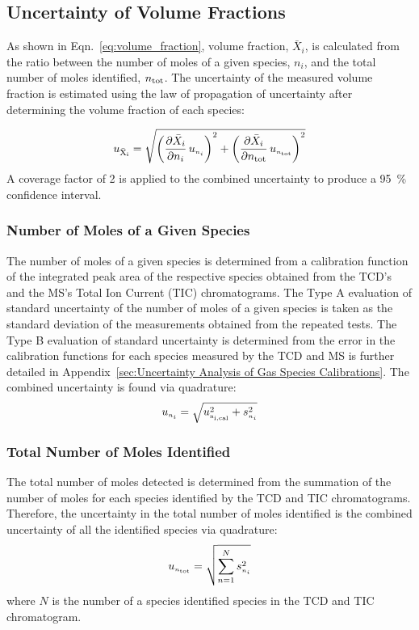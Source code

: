 \documentclass[12pt]{article}
\begin{document}
\subsection{Uncertainty of Volume Fractions} \label{sec:UncertaintyMoleFrac}
As shown in Eqn.~\ref{eq:volume_fraction}, volume fraction, $\bar{X}_{i}$, is calculated from the ratio between the number of moles of a given species, $n_{i}$, and the total number of moles identified, $n_{\rm tot}$. The uncertainty of the measured volume fraction is estimated using the law of propagation of uncertainty after determining the volume fraction of each species:

\begin{equation}
\label{eq:Volume_Frac_Uncertainty}
u_\mathrm{\bar{X}_{i}} = \sqrt{{\left( \frac{\partial \bar{X}_{i}}{\partial n_{i}}\,u_{\scriptscriptstyle n_{i}} \right)}^2+{\left(\frac{\partial \bar{X}_{i}}{\partial n_{\rm tot}}\,u_{\scriptscriptstyle n_{\rm tot}}\right)}^2}
\end{equation}
A coverage factor of 2 is applied to the combined uncertainty to produce a 95~\% confidence interval.

\subsubsection{Number of Moles of a Given Species}
\label{ssec:Number_of_Moles_of_a_Given_Species}

The number of moles of a given species is determined from a calibration function of the integrated peak area of the respective species obtained from the TCD's and the MS's Total Ion Current (TIC) chromatograms. The Type A evaluation of standard uncertainty of the number of moles of a given species is taken as the standard deviation of the measurements obtained from the repeated tests. The Type B evaluation of standard uncertainty is determined from the error in the calibration functions for each species measured by the TCD and MS is further detailed in Appendix~\ref{sec:Uncertainty Analysis of Gas Species Calibrations}. The combined uncertainty is found via quadrature:
\begin{equation}
\label{eq:gasspeciesuncertaintycertainty}
u_{\scriptscriptstyle n_{i}} = \sqrt{ u_{\rm \scriptscriptstyle n_{i,\rm cal}}^2 + s_{\scriptscriptstyle n_{i}}^2}
\end{equation}

\subsubsection{Total Number of Moles Identified}
\label{ssec:Total Number of Moles Identified}
The total number of moles detected is determined from the summation of the number of moles for each species identified by the TCD and TIC chromatograms. Therefore, the uncertainty in the total number of moles identified is the combined uncertainty of all the identified species via quadrature:
\begin{equation}
\label{eq:totalnumberofmolesdetected}
u_{\scriptscriptstyle n_{\rm tot}}=\sqrt{{\sum_{n=1}^{N} s_{\scriptscriptstyle n_{i}}^2}}
\end{equation}
where $N$ is the number of a species identified species in the TCD and TIC chromatogram.
\end{document}
